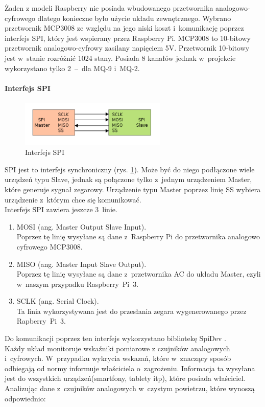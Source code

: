 \documentclass[polish,bachelor,a4paper,oneside]{ppfcmthesis}
\begin{document}
    Żaden z modeli Raspberry nie posiada wbudowanego przetwornika analogowo-cyfrowego dlatego konieczne było użycie układu zewnętrznego. Wybrano przetwornik MCP3008 ze względu na jego niski koszt i~komunikację poprzez interfejs SPI, który jest wspierany przez Raspberry Pi. MCP3008 to 10-bitowy przetwornik analogowo-cyfrowy zasilany napięciem 5V.  Przetwornik 10-bitowy jest w~stanie rozróżnić 1024 stany. Posiada 8 kanałów jednak w~projekcie wykorzystano tylko 2~–~dla MQ-9 i~MQ-2.
    \paragraph{Interfejs SPI}
    \begin{figure}[ht]
        \centering
        \includegraphics[width=7cm]{SPI.png}
        \caption{Interfejs SPI \protect\cite{spi}}
        \label{spi}
    \end{figure}
    SPI jest to interfejs synchroniczny (rys. \ref{spi}). Może być do niego podłączone wiele urządzeń typu Slave, jednak są połączone tylko z~jednym urządzeniem Master, które generuje sygnał zegarowy. Urządzenie typu Master poprzez linię SS wybiera urządzenie z~którym chce się komunikować. \\
    Interfejs SPI zawiera jeszcze 3~linie.
    \begin{enumerate}
        \item MOSI (ang. Master Output Slave Input). \\
        Poprzez tę linię wysyłane są dane z~Raspberry Pi do przetwornika analogowo cyfrowego MCP3008.
        \item MISO (ang. Master Input Slave Output).\\
        Poprzez tę linię wysyłane są dane z~przetwornika AC do układu Master, czyli w~naszym przypadku Raspberry~Pi~3.
        \item SCLK (ang. Serial Clock).\\
        Ta linia wykorzystywana jest do przesłania zegara wygenerowanego przez Rapberry~Pi~3.
    \end{enumerate}
    Do komunikacji poprzez ten interfejs wykorzystano bibliotekę SpiDev \cite{spidev}. \\
    Każdy układ monitoruje wskaźniki pomiarowe z czujników analogowych i~cyfrowych. W~przypadku wykrycia wskazań, które w~znaczący sposób odbiegają od normy informuje właściciela o~zagrożeniu. Informacja ta wysyłana jest do wszystkich urządzeń(smartfony, tablety itp), które posiada właściciel.  Analizując dane z~czujników analogowych w~czystym powietrzu, które wynoszą odpowiednio:\\
\end{document}
